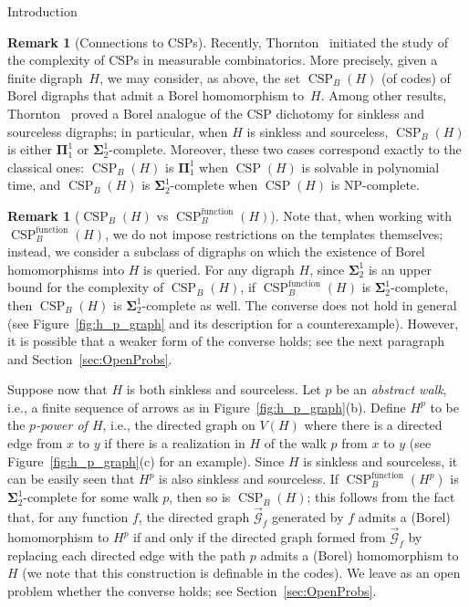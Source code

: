 \documentclass[psamsfonts]{amsart}
\theoremstyle{definition}
\newtheorem{remark}[thm]{Remark}
\theoremstyle{remark}
\numberwithin{equation}{section}
\newcommand\mbf{\mathbf}
\begin{document}
\begin{section}{Introduction}
\begin{remark}[Connections to CSPs]
    Recently, Thornton~\cite{thornton2022} initiated the study of the complexity of CSPs in measurable combinatorics.
    More precisely, given a finite digraph~$H$, we may consider, as above, the set $\operatorname{CSP}_B(H)$ (of codes) of Borel digraphs that admit a Borel homomorphism to~$H$.
    Among other results, Thornton~\cite{thornton2022} proved a Borel analogue of the CSP dichotomy for sinkless and sourceless digraphs; in particular, when $H$ is sinkless and sourceless, $\operatorname{CSP}_B(H)$ is either $\mathbf{\Pi}^1_1$ or $\mathbf{\Sigma}^1_2$-complete.
    Moreover, these two cases correspond exactly to the classical ones: $\operatorname{CSP}_B(H)$ is $\mathbf{\Pi}^1_1$ when $\operatorname{CSP}(H)$ is solvable in polynomial time, and $\operatorname{CSP}_B(H)$ is $\mathbf{\Sigma}^1_2$-complete when $\operatorname{CSP}(H)$ is \textsf{NP}-complete.
\end{remark}

\begin{remark}[$\operatorname{CSP}_B(H)$ vs $\operatorname{CSP}^{\operatorname{function}}_B(H)$]
Note that, when working with $\operatorname{CSP}^{\operatorname{function}}_B(H)$, we do not impose restrictions on the templates themselves; instead, we consider a subclass of digraphs on which the existence of Borel homomorphisms into $H$ is queried. For any digraph $H$, since $\mathbf{\Sigma}^1_2$ is an upper bound for the complexity of $\operatorname{CSP}_B(H)$, if $\operatorname{CSP}^{\operatorname{function}}_B(H)$ is $\mathbf{\Sigma}^1_2$-complete, then $\operatorname{CSP}_B(H)$ is $\mathbf{\Sigma}^1_2$-complete as well. The converse does not hold in general (see Figure~\ref{fig:h_p_graph} and its description for a counterexample).
However, it is possible that a weaker form of the converse holds; see the next paragraph and Section~\ref{sec:OpenProbs}.

Suppose now that $H$ is both sinkless and sourceless.
Let $p$ be an \emph{abstract walk}, i.e., a finite sequence of arrows as in Figure~\ref{fig:h_p_graph}(b).
Define $H^p$ to be the \emph{$p$-power of $H$}, i.e., the directed graph on $V(H)$ where there is a directed edge from $x$ to $y$ if there is a realization in $H$ of the walk $p$ from $x$ to $y$ (see Figure~\ref{fig:h_p_graph}(c) for an example).
Since $H$ is sinkless and sourceless, it can be easily seen that $H^p$ is also sinkless and sourceless.
If $\operatorname{CSP}^{\operatorname{function}}_B(H^p)$ is $\mbf{\Sigma}^1_2$-complete for some walk $p$, then so is $\operatorname{CSP}_B(H)$; this follows from the fact that, for any function $f$, the directed graph $\overrightarrow{\mathcal{G}}_f$ generated by $f$ admits a (Borel) homomorphism to $H^p$ if and only if the directed graph formed from $\overrightarrow{\mathcal{G}}_f$ by replacing each directed edge with the path $p$ admits a (Borel) homomorphism to $H$ (we note that this construction is definable in the codes).
We leave as an open problem whether the converse holds; see Section~\ref{sec:OpenProbs}.
\end{remark}




\end{section}
\end{document}

